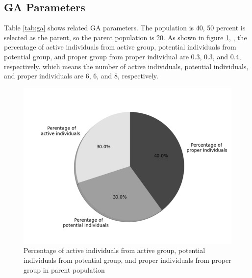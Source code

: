 \subsection{GA Parameters}
Table \ref{tab:ga} shows related GA parameters. The population is 40, 50
percent is selected as the parent, so the parent population is 20. As shown in figure \ref{fig:group},
, the percentage of active individuals from active group, potential
individuals from potential group, and proper group from proper individual are
0.3, 0.3, and 0.4, respectively. which means the number of active individuals,
potential individuals, and proper individuals are 6, 6, and 8, respectively.

\begin{figure}[!htb]
	\centering
	\includegraphics[width=\linewidth]{fig/percentage_of_groups}
	\caption{Percentage of active individuals from active group, potential
	  individuals from potential group, and proper individuals from proper group
	 in parent population}
	\label{fig:group}
\end{figure}



